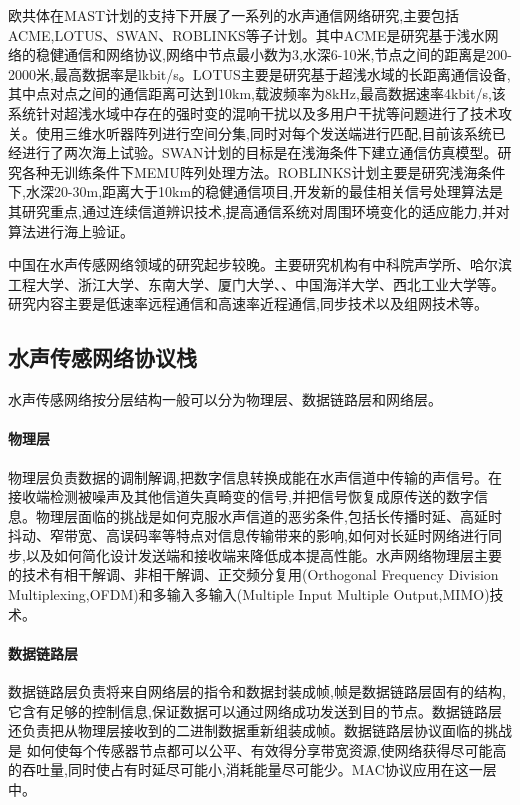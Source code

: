 欧共体在MAST计划的支持下开展了一系列的水声通信网络研究,主要包括ACME,LOTUS、SWAN、ROBLINKS等子计划\cite{赵占伟2011水声通信网络}。其中ACME\cite{acar2006acmenet}是研究基于浅水网络的稳健通信和网络协议,网络中节点最小数为3,水深6-10米,节点之间的距离是200-2000米,最高数据率是lkbit/s。LOTUS主要是研究基于超浅水域的长距离通信设备,其中点对点之间的通信距离可达到10km,载波频率为8kHz,最高数据速率4kbit/s,该系统针对超浅水域中存在的强时变的混响干扰以及多用户干扰等问题进行了技术攻关。使用三维水听器阵列进行空间分集,同时对每个发送端进行匹配,目前该系统已经进行了两次海上试验。SWAN计划的目标是在浅海条件下建立通信仿真模型。研究各种无训练条件下MEMU阵列处理方法。ROBLINKS\cite{van2000roblinks}计划主要是研究浅海条件下,水深20-30m,距离大于10km的稳健通信项目,开发新的最佳相关信号处理算法是其研究重点,通过连续信道辨识技术,提高通信系统对周围环境变化的适应能力,并对算法进行海上验证。

中国在水声传感网络领域的研究起步较晚。主要研究机构有中科院声学所、哈尔滨工程大学、浙江大学、东南大学、厦门大学、、中国海洋大学、西北工业大学等。研究内容主要是低速率远程通信和高速率近程通信,同步技术以及组网技术等。

\subsection{水声传感网络协议栈}
水声传感网络按分层结构一般可以分为物理层、数据链路层和网络层\cite{赵占伟2011水声通信网络}。
\paragraph{物理层}
物理层负责数据的调制解调,把数字信息转换成能在水声信道中传输的声信号。在接收端检测被噪声及其他信道失真畸变的信号,并把信号恢复成原传送的数字信息。物理层面临的挑战是如何克服水声信道的恶劣条件,包括长传播时延、高延时抖动、窄带宽、高误码率等特点对信息传输带来的影响,如何对长延时网络进行同步,以及如何简化设计发送端和接收端来降低成本提高性能。水声网络物理层主要的技术有相干解调、非相干解调、正交频分复用(Orthogonal Frequency Division Multiplexing,OFDM)和多输入多输入(Multiple Input Multiple Output,MIMO)技术。
\paragraph{数据链路层}
数据链路层负责将来自网络层的指令和数据封装成帧,帧是数据链路层固有的结构,它含有足够的控制信息,保证数据可以通过网络成功发送到目的节点。数据链路层还负责把从物理层接收到的二进制数据重新组装成帧。数据链路层协议面临的挑战是
如何使每个传感器节点都可以公平、有效得分享带宽资源,使网络获得尽可能高的吞吐量,同时使占有时延尽可能小,消耗能量尽可能少。MAC协议应用在这一层中。
